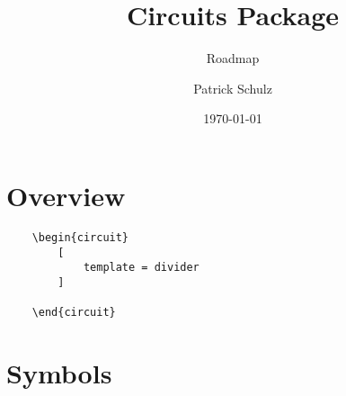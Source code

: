 \documentclass[parskip=half]{scrartcl}
\title{Circuits Package}
\subtitle{Roadmap}
\author{Patrick Schulz}
\date{\today} %
\begin{document}
    \maketitle
    \tableofcontents
    \section{Overview}
    \begin{lstlisting}
    \begin{circuit}
        [
            template = divider
        ]

    \end{circuit}
    \end{lstlisting}
    \section{Symbols}
\end{document}
